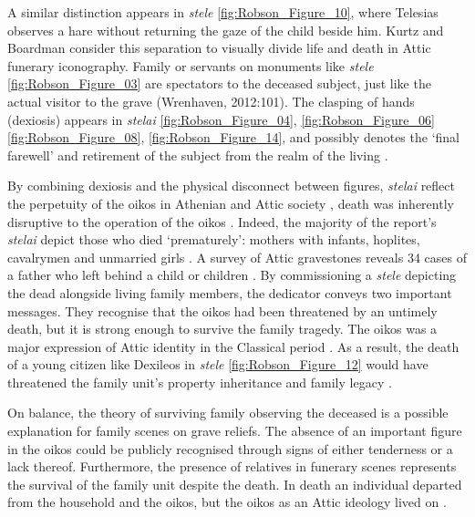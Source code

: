 A similar distinction appears in \textit{stele} \ref{fig:Robson_Figure_10}, where Telesias observes a hare without returning the gaze of the child beside him. Kurtz and Boardman consider this separation to visually divide life and death in Attic funerary iconography.
Family or servants on monuments like \textit{stele} \ref{fig:Robson_Figure_03} are spectators to the deceased subject, just like the actual visitor to the grave (Wrenhaven, 2012:101).
The clasping of hands (dexiosis) appears in \textit{stelai} \ref{fig:Robson_Figure_04}, \ref{fig:Robson_Figure_06}\ref{fig:Robson_Figure_08}, \ref{fig:Robson_Figure_14}, and possibly denotes the \enquote*{final farewell} and retirement of the subject from the realm of the living \parencite[247]{Mee2011}.

By combining dexiosis and the physical disconnect between figures, \textit{stelai} reflect the perpetuity of the oikos in Athenian and Attic society \parencite[23]{Pomeroy1997},
death was inherently disruptive to the operation of the oikos \parencite[128]{Stears1995}.
Indeed, the majority of the report’s \textit{stelai} depict those who died \enquote*{prematurely}: mothers with infants, hoplites, cavalrymen and unmarried girls \parencite[119]{Stears1995}.
A survey of Attic gravestones reveals 34 cases of a father who left behind a child or children \parencite[111]{Humphreys1993}.
By commissioning a \textit{stele} depicting the dead alongside living family members, the dedicator conveys two important messages. They recognise that the oikos had been threatened by an untimely death, but it is strong enough to survive the family tragedy. The oikos was a major expression of Attic identity in the Classical period \parencite[3]{Grossman2001}.
As a result, the death of a young citizen like Dexileos in \textit{stele} \ref{fig:Robson_Figure_12} would have threatened the family unit’s property inheritance and family legacy \parencite[62]{Gray2011}.

On balance, the theory of surviving family observing the deceased is a possible explanation for family scenes on grave reliefs. The absence of an important figure in the oikos could be publicly recognised through signs of either tenderness or a lack thereof. Furthermore, the presence of relatives in funerary scenes represents the survival of the family unit despite the death. In death an individual departed from the household and the oikos, but the oikos as an Attic ideology lived on \parencite[23]{Pomeroy1997}.

